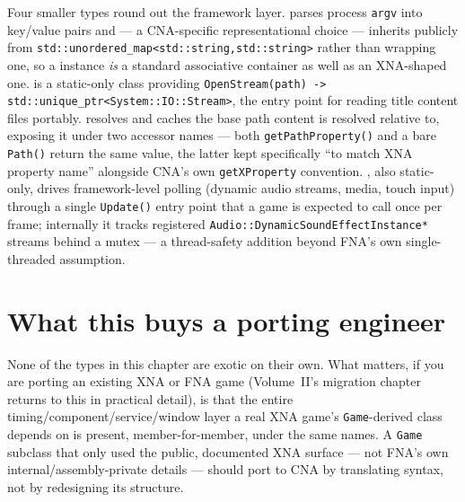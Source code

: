 Four smaller types round out the framework layer.  parses process
\texttt{argv} into key/value pairs and --- a CNA-specific representational choice --- inherits
publicly from \texttt{std::unordered\_map<std::string,std::string>} rather than wrapping one,
so a  instance \emph{is} a standard associative container as well
as an XNA-shaped one.  is a static-only class providing
\texttt{OpenStream(path) -> std::unique\_ptr<System::IO::Stream>}, the entry point for
reading title content files portably.  resolves and caches the base
path content is resolved relative to, exposing it under two accessor names --- both
\texttt{getPathProperty()} and a bare \texttt{Path()} return the same value, the latter kept
specifically ``to match XNA property name'' alongside CNA's own \texttt{getXProperty}
convention. , also static-only, drives framework-level polling
(dynamic audio streams, media, touch input) through a single \texttt{Update()} entry point
that a game is expected to call once per frame; internally it tracks registered
\texttt{Audio::DynamicSoundEffectInstance*} streams behind a mutex --- a thread-safety
addition beyond FNA's own single-threaded assumption.

\section{What this buys a porting engineer}

None of the types in this chapter are exotic on their own. What matters, if you are porting
an existing XNA or FNA game (Volume~II's migration chapter returns to this in practical
detail), is that the entire timing/component/service/window layer a real XNA game's
\texttt{Game}-derived class depends on is present, member-for-member, under the same names.
A \texttt{Game} subclass that only used the public, documented XNA surface --- not FNA's own
internal/assembly-private details --- should port to CNA by translating syntax, not by
redesigning its structure.
